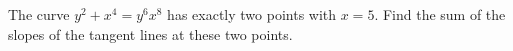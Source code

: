 The curve $y^2+x^4=y^6x^8$ has exactly two points with $x=5$. Find the sum of the slopes of the tangent lines at these two points.

